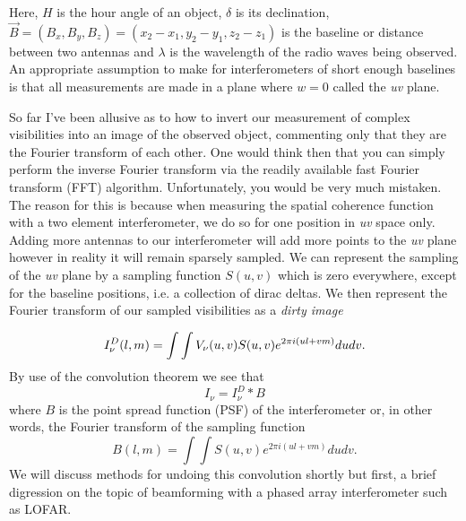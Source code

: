 Here, $H$ is the hour angle of an object, $\delta$ is its declination, $\Vec{B}=(B_x, B_y, B_z)=(x_2-x_1,y_2-y_1,z_2-z_1)$ is the baseline or distance between two antennas and $\lambda$ is the wavelength of the radio waves being observed. An appropriate assumption to make for interferometers of short enough baselines is that all measurements are made in a plane where $w = 0$ called the \textit{uv} plane.

So far I've been allusive as to how to invert our measurement of complex visibilities into an image of the observed object, commenting only that they are the Fourier transform of each other. One would think then that you can simply perform the inverse Fourier transform via the readily available fast Fourier transform (FFT) algorithm. Unfortunately, you would be very much mistaken. The reason for this is because when measuring the spatial coherence function with a two element interferometer, we do so for one position in \textit{uv} space only. Adding more antennas to our interferometer will add more points to the \textit{uv} plane however in reality it will remain sparsely sampled. We can represent the sampling of the \textit{uv} plane by a sampling function $S(u,v)$ which is zero everywhere, except for the baseline positions, i.e. a collection of dirac deltas. We then represent the Fourier transform of our sampled visibilities as a \textit{dirty image}

\begin{equation}
\label{eq:int_dirtyimage}
I_\nu^D(l, m) = \int \int V_\nu (u,v) S(u,v)e^{2 \pi i (ul + vm)} du dv.\\
\end{equation} 
By use of the convolution theorem we see that 
\begin{equation}
\label{eq:int_convolution}
I_\nu = I_\nu^D \ast B
\end{equation}
where $B$ is the point spread function (PSF) of the interferometer or, in other words, the Fourier transform of the sampling function
\begin{equation}
\label{eq:int_psf}
B(l,m) = \int \int S(u,v) e^{2 \pi i(ul+vm)} du dv.
\end{equation}
We will discuss methods for undoing this convolution shortly but first, a brief digression on the topic of beamforming with a phased array interferometer such as LOFAR.


